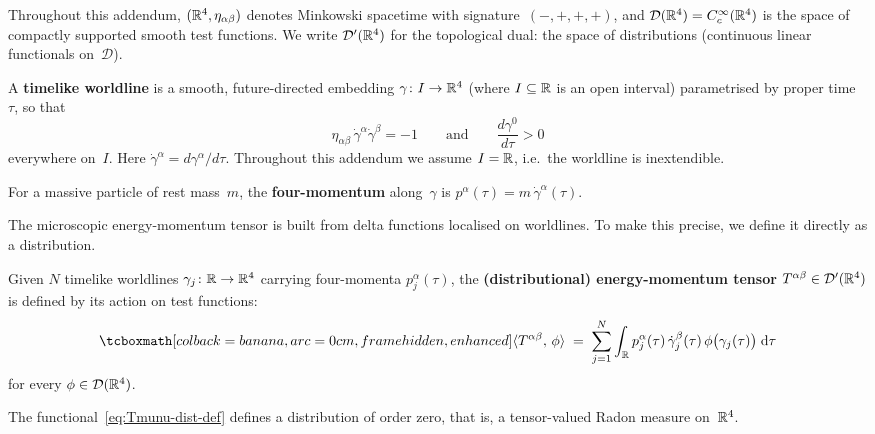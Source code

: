 Throughout this addendum, $(\mathbb{R}^{4}, \eta_{\alpha\beta})$ denotes
Minkowski spacetime with signature~$(-,+,+,+)$, and
$\mathcal{D}(\mathbb{R}^{4}) = C_c^\infty(\mathbb{R}^{4})$ is the space of
compactly supported smooth test functions.  We write
$\mathcal{D}'(\mathbb{R}^{4})$ for the topological dual: the space of
distributions (continuous linear functionals on~$\mathcal{D}$).

\begin{definition}\label{def:timelike-worldline}
  A \textbf{timelike worldline} is a smooth, future-directed
  embedding $\gamma\colon I \to \mathbb{R}^{4}$ (where $I\subseteq\mathbb{R}$ is
  an open interval) parametrised by proper time~$\tau$, so that
  \begin{equation}\label{eq:timelike-condition}
    \eta_{\alpha\beta}\,\dot\gamma^\alpha\dot\gamma^\beta = -1
    \qquad\text{and}\qquad
    \frac{d\gamma^0}{d\tau} > 0
  \end{equation}
  everywhere on~$I$.  Here
  $\dot\gamma^\alpha = d\gamma^\alpha/d\tau$.  Throughout this
  addendum we assume $I = \mathbb{R}$, i.e.\ the worldline is
  inextendible.
\end{definition}

\noindent
For a massive particle of rest mass~$m$, the
\textbf{four-momentum} along~$\gamma$ is
$p^\alpha(\tau) = m\,\dot\gamma^\alpha(\tau)$.

The microscopic energy-momentum tensor is built from delta
functions localised on worldlines.  To make this precise, we define
it directly as a distribution.

\begin{definition}%
\label{def:Tmunu-dist}
  Given $N$ timelike worldlines $\gamma_j\colon \mathbb{R} \to \mathbb{R}^{4}$
  carrying four-momenta $p_j^\alpha(\tau)$, the
  \textbf{(distributional) energy-momentum tensor}
  $T^{\alpha\beta} \in \mathcal{D}'(\mathbb{R}^{4})$ is defined by its
  action on test functions:
  \begin{equation}\label{eq:Tmunu-dist-def}
    \eqbox{\langle T^{\alpha\beta},\, \phi\rangle
      \;=\; \sum_{j=1}^{N} \int_{\R} p_j^\alpha(\tau)\,
        \dot\gamma_j^\beta(\tau)\,
        \phi\bigl(\gamma_j(\tau)\bigr)\;\dd\tau}
  \end{equation}
  for every $\phi \in \mathcal{D}(\mathbb{R}^{4})$.
\end{definition}

\begin{proposition}\label{prop:Tmunu-well-defined}
  The functional~\eqref{eq:Tmunu-dist-def} defines a distribution
  of order zero, that is, a tensor-valued Radon measure
  on~$\mathbb{R}^{4}$.
\end{proposition}

